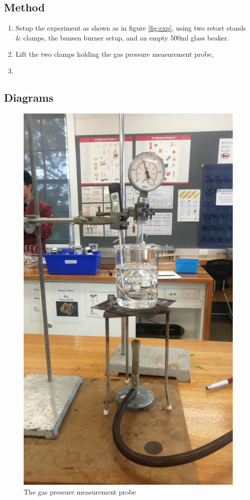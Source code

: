 \documentclass[a4paper,12pt]{article}
\begin{document}
\subsection{Method}


\begin{enumerate}
    \item Setup the experiment as shown as in figure \ref{fig:exp}, using two retort stands \& clamps, the bunsen burner setup, and an empty 500ml glass beaker.
    \item Lift the two clamps holding the gas pressure measurement probe, 
    \item 

\end{enumerate}

\subsection{Diagrams}

\begin{figure}[H]
 \centering
 \includegraphics[scale=0.2]{assets/setup.jpg}
 \caption{The gas pressure measurement probe}
 \label{fig:gpmp}
\end{figure}
\end{document}
